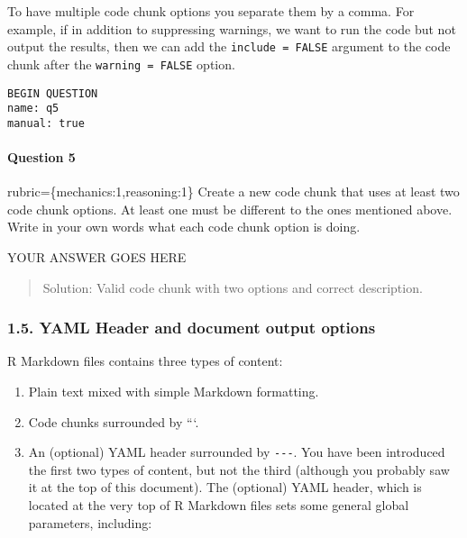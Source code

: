 \documentclass[
]{article}
\providecommand{\tightlist}{%
  \setlength{\itemsep}{0pt}\setlength{\parskip}{0pt}}
\begin{document}
To have multiple code chunk options you separate them by a comma. For
example, if in addition to suppressing warnings, we want to run the code
but not output the results, then we can add the
\texttt{include\ =\ FALSE} argument to the code chunk after the
\texttt{warning\ =\ FALSE} option.

\begin{verbatim}
BEGIN QUESTION
name: q5
manual: true
\end{verbatim}

\begin{alert alert-info}
\hypertarget{question-5}{%
\paragraph{Question 5}\label{question-5}}

rubric=\{mechanics:1,reasoning:1\} Create a new code chunk that uses at
least two code chunk options. At least one must be different to the ones
mentioned above. Write in your own words what each code chunk option is
doing.
\end{alert alert-info}

YOUR ANSWER GOES HERE

\begin{quote}
Solution: Valid code chunk with two options and correct description.
\end{quote}

\hypertarget{yaml-header-and-document-output-options}{%
\subsubsection{1.5. YAML Header and document output
options}\label{yaml-header-and-document-output-options}}

R Markdown files contains three types of content:

\begin{enumerate}
\def\labelenumi{\arabic{enumi}.}
\tightlist
\item
  Plain text mixed with simple Markdown formatting.
\item
  Code chunks surrounded by ```.
\item
  An (optional) YAML header surrounded by \texttt{-\/-\/-}. You have
  been introduced the first two types of content, but not the third
  (although you probably saw it at the top of this document). The
  (optional) YAML header, which is located at the very top of R Markdown
  files sets some general global parameters, including:
\end{enumerate}
\end{document}
